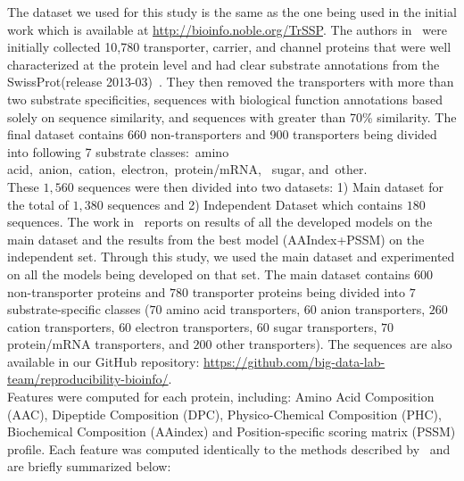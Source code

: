{
The dataset we used for this study is the same as the one being used in the initial work which is 
available at \url{http://bioinfo.noble.org/TrSSP}. The authors in~\cite{mishra2014prediction} were initially collected 
10,780 transporter, carrier, and channel proteins that were well characterized at the protein level and had clear substrate 
annotations from the SwissProt(release 2013-03)~\cite{boeckmann2003swiss}. They then removed the transporters 
with more than two substrate specificities, sequences with biological function annotations based solely on sequence 
similarity, and sequences with greater than 70\% similarity. The final dataset contains 660 non-transporters and 
900 transporters being divided into following 7 substrate classes: amino acid, anion, cation, electron, protein/mRNA, 
sugar, and other.\\
These $1,560$ sequences were then divided into two datasets: 1) Main dataset for the total of $1,380$ sequences 
and 2) Independent Dataset which contains $180$ sequences. The work in~\cite{mishra2014prediction} reports on results of 
all the developed models on the main dataset and the results from the best model (AAIndex+PSSM) on the independent set. 
Through this study, we used the main dataset and experimented on all the models being developed on that set. 
The main dataset contains $600$ non-transporter proteins and $780$ transporter proteins being divided into $7$ 
substrate-specific classes ($70$ amino acid transporters, $60$ anion transporters, $260$ cation transporters, 
$60$ electron transporters, $60$ sugar transporters, $70$ protein/mRNA transporters, and $200$ other transporters). 
The sequences are also available in our GitHub repository: \url{https://github.com/big-data-lab-team/reproducibility-bioinfo/}.
}\\

Features were computed for each protein, including: Amino Acid Composition (AAC), Dipeptide Composition (DPC),
Physico-Chemical Composition (PHC), Biochemical Composition (AAindex) and Position-specific scoring matrix (PSSM)
profile. Each feature was computed identically to the methods described by~\cite{mishra2014prediction} and are briefly
summarized below:

